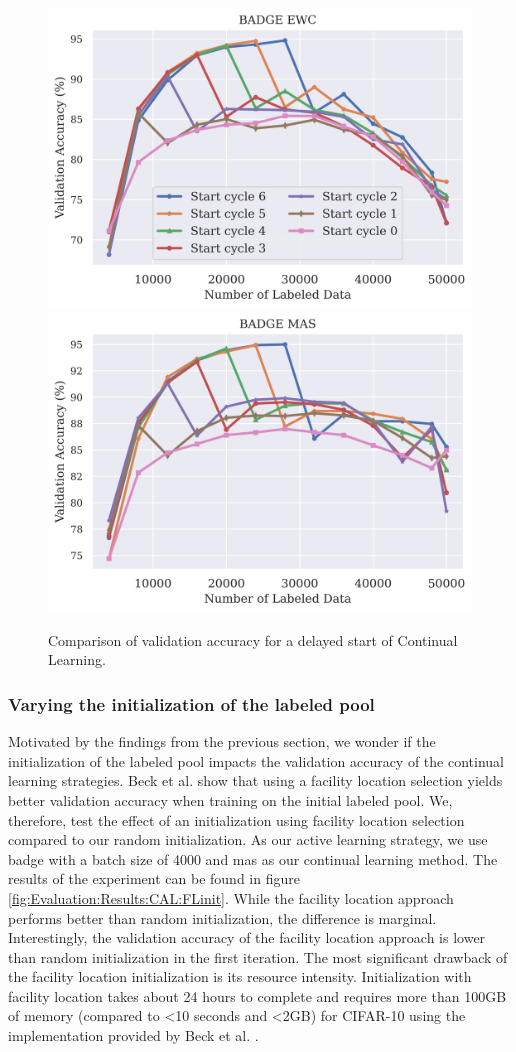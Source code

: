 \begin{figure}[h]
    \centering
    \includegraphics[width=0.45\linewidth]{images/results_CAL/delayed_start_badge_ewc.png} \hfill
    \includegraphics[width=0.45\linewidth]{images/results_CAL/delayed_start_badge_mas.png}
    \caption{Comparison of validation accuracy for a delayed start of Continual Learning.}
    \label{fig:Evaluation:CAL:DelayedStart}
\end{figure}

\subsubsection{Varying the initialization of the labeled pool}
\label{sec:Evaluation:CAL:Initialization}
Motivated by the findings from the previous section, we wonder if the initialization of the labeled pool impacts the validation accuracy of the continual learning strategies.
Beck et al. \cite{beck2021effective} show that using a facility location selection \cite{iyer2021submodular} yields better validation accuracy when training on the initial labeled pool.
We, therefore, test the effect of an initialization using facility location selection compared to our random initialization. As our active learning strategy, we use \gls{badge} with
a batch size of 4000 and \gls{mas} as our continual learning method. The results of the experiment can be found in figure \ref{fig:Evaluation:Results:CAL:FLinit}. While the facility
location approach performs better than random initialization, the difference is marginal. Interestingly, the validation accuracy of the facility location approach is lower than
random initialization in the first iteration. The most significant drawback of the facility location initialization is its resource intensity. Initialization with facility
location takes about 24 hours to complete and requires more than 100GB of memory (compared to <10 seconds and <2GB) for CIFAR-10 using the implementation provided by Beck et al.
\cite{beck2021effective}. \par

